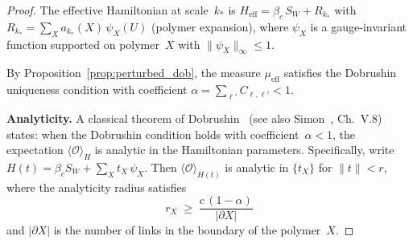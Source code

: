 \documentclass[11pt,a4paper]{article}
\theoremstyle{plain}
\theoremstyle{definition}
\theoremstyle{remark}
\begin{document}
\begin{proof}
The effective Hamiltonian at scale~$k_*$ is
$H_{\mathrm{eff}} = \beta_c\,S_W + R_{k_*}$
with $R_{k_*} = \sum_X a_{k_*}(X)\,\psi_X(U)$
(polymer expansion), where $\psi_X$ is a gauge-invariant
function supported on polymer~$X$ with
$\|\psi_X\|_\infty \leq 1$.

By Proposition~\ref{prop:perturbed_dob}, the measure
$\mu_{\mathrm{eff}}$ satisfies the Dobrushin uniqueness
condition with coefficient
$\alpha = \sum_{\ell'} C_{\ell,\ell'} < 1$.

\smallskip
\noindent\textbf{Analyticity.}
A classical theorem of Dobrushin~\cite{Dobrushin68}
(see also Simon~\cite{Simon_statistical},
Ch.~V.8) states: when the Dobrushin condition holds with
coefficient~$\alpha < 1$, the expectation
$\langle\mathcal{O}\rangle_H$ is analytic in the
Hamiltonian parameters.  Specifically, write
$H(t) = \beta_c S_W + \sum_X t_X\,\psi_X$.
Then $\langle\mathcal{O}\rangle_{H(t)}$ is analytic in
$\{t_X\}$ for $\|t\| < r$, where the analyticity radius
satisfies
\begin{equation}
  r_X \;\geq\; \frac{c\,(1-\alpha)}{|\partial X|}
\end{equation}
and $|\partial X|$ is the number of links in the boundary
of the polymer~$X$.


\end{proof}
\end{document}
